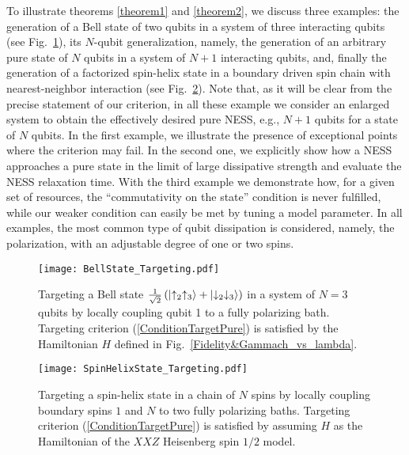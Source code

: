 \documentclass[aps,pra,letterpaper,twocolumn,showpacs,superscriptaddress,floatfix,longbibliography]{revtex4-1}
\begin{document}
To illustrate theorems \ref{theorem1} and \ref{theorem2}, we discuss
three examples: the generation of a Bell state of two qubits in a
system of three interacting qubits (see
Fig.~\ref{BellState_Targeting}), its $N$-qubit generalization, namely,
the generation of an arbitrary pure state of $N$ qubits in a system of
$N+1$ interacting qubits, and, finally the generation of a factorized
spin-helix state in a boundary driven spin chain with nearest-neighbor
interaction (see Fig.~\ref{SpinHelixState_Targeting}).  Note that, as
it will be clear from the precise statement of our criterion, in all
these example we consider an enlarged system to obtain the effectively
desired pure NESS, e.g., $N+1$ qubits for a state of $N$ qubits.  In
the first example, we illustrate the presence of exceptional points
where the criterion may fail.  In the second one, we explicitly show
how a NESS approaches a pure state in the limit of large dissipative
strength and evaluate the NESS relaxation time. With the third example
we demonstrate how, for a given set of resources, the ``commutativity
on the state'' condition is never fulfilled, while our weaker
condition can easily be met by tuning a model parameter. In all
examples, the most common type of qubit dissipation is considered,
namely, the polarization, with an adjustable degree of one or two
spins.
\begin{figure}[t]
  \begin{center}
    \texttt{[image: BellState\_Targeting.pdf]}
    \caption{ Targeting a Bell state $\textstyle{\frac{1}{\sqrt{2}}}
      \left( |{\uparrow_2 \uparrow_3}\rangle + |{\downarrow_2
          \downarrow_3}\rangle\right)$ in a system of $N=3$ qubits by locally
      coupling qubit 1 to a fully polarizing bath.  Targeting
      criterion (\ref{ConditionTargetPure}) is satisfied by the
      Hamiltonian $H$ defined in
      Fig.~\ref{Fidelity&Gammach_vs_lambda}.}
    \label{BellState_Targeting}
  \end{center}
\end{figure}
\begin{figure}[t]
  \begin{center}
    \texttt{[image: SpinHelixState\_Targeting.pdf]}
  \end{center}
  \caption{ Targeting a spin-helix state in a chain of $N$ spins by
    locally coupling boundary spins $1$ and $N$ to two fully
    polarizing baths.  Targeting criterion (\ref{ConditionTargetPure})
    is satisfied by assuming $H$ as the Hamiltonian of the $XXZ$
    Heisenberg spin $1/2$ model.}%
  \label{SpinHelixState_Targeting}
\end{figure}
\end{document}
